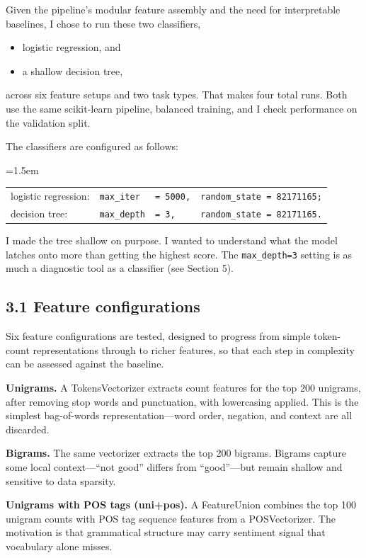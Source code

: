 \documentclass[12pt]{article}
\begin{document}
Given the pipeline's modular feature assembly and the need for interpretable baselines, I chose to run these two classifiers,
\begin{itemize}
  \item logistic regression, and
  \item a shallow decision tree,
\end{itemize}
across six feature setups and two task types. That makes four total runs. Both use the same scikit-learn pipeline, balanced training, and I check performance on the validation split.

The classifiers are configured as follows:

{\leftskip=1.5em
\begin{tabular}{@{\textbullet\quad}llll@{}}
logistic regression: & \texttt{max\_iter}  & \texttt{= 5000,} & \texttt{random\_state = 82171165;} \\
decision tree:       & \texttt{max\_depth} & \texttt{= 3,}    & \texttt{random\_state = 82171165.} \\
\end{tabular}\par}

I made the tree shallow on purpose.
I wanted to understand what the model latches onto more than getting the highest score.
The \texttt{max\_depth=3} setting is as much a diagnostic tool as a classifier (see Section 5).



\subsection*{3.1 Feature configurations}



Six feature configurations are tested, designed to progress from simple token-count representations through to richer features, so that each step in complexity can be assessed against the baseline.

\textbf{Unigrams.} A TokensVectorizer extracts count features for the top 200 unigrams, after removing stop words and punctuation, with lowercasing applied. This is the simplest bag-of-words representation---word order, negation, and context are all discarded.

\textbf{Bigrams.} The same vectorizer extracts the top 200 bigrams. Bigrams capture some local context---``not good'' differs from ``good''---but remain shallow and sensitive to data sparsity.

\textbf{Unigrams with POS tags (uni+pos).} A FeatureUnion combines the top 100 unigram counts with POS tag sequence features from a POSVectorizer. The motivation is that grammatical structure may carry sentiment signal that vocabulary alone misses.
\end{document}
